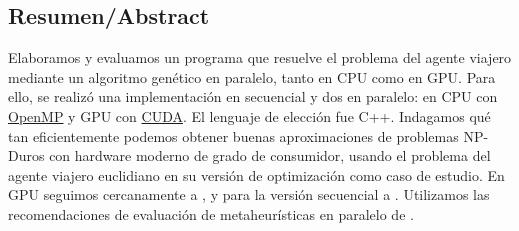 \documentclass{article}
\begin{document}
\begin{titlepage}
\begin{centering}
        \subsection*{Resumen/Abstract}

        Elaboramos y evaluamos un programa que resuelve el problema del agente
        viajero mediante un algoritmo genético en paralelo, tanto en CPU como
        en GPU. Para ello, se realizó una implementación en secuencial y dos en
        paralelo: en CPU con \href{https://www.openmp.org/}{OpenMP} y GPU con
        \href{https://developer.nvidia.com/cuda-toolkit}{CUDA}. El lenguaje de
        elección fue C++. Indagamos qué tan eficientemente podemos obtener
        buenas aproximaciones de problemas NP-Duros con hardware moderno de
        grado de consumidor, usando el problema del agente viajero euclidiano
        en su versión de optimización como caso de estudio. En GPU seguimos
        cercanamente a \cite[84-90]{ipn_gpu}, y para la versión secuencial a
        \cite[55-69]{pav_tesis}. Utilizamos las recomendaciones de evaluación
        de metaheurísticas en paralelo de \cite{alba_ch2}.
 
        \vspace{1cm}
        \vfill
    \end{centering}
    \end{titlepage}


    \pagestyle{logotipos}

    \printbibliography
\end{document}
